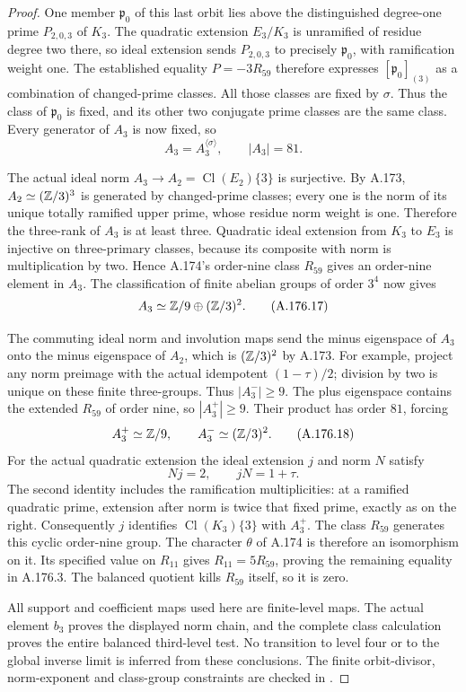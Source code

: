 \begin{proof}
One member \(\mathfrak p_0\) of this last orbit lies above the
distinguished degree-one prime \(P_{2,0,3}\) of \(K_3\).
The quadratic extension \(E_3/K_3\) is unramified of residue
degree two there, so ideal extension sends
\(P_{2,0,3}\) to precisely \(\mathfrak p_0\), with ramification
weight one.
The established equality \(P=-3R_{59}\) therefore expresses
\([\mathfrak p_0]_{(3)}\) as a combination of changed-prime
classes.  All those classes are fixed by \(\sigma\).
Thus the class of \(\mathfrak p_0\) is fixed, and its other
two conjugate prime classes are the same class.
Every generator of \(A_3\) is now fixed, so
\[
                              A_3=A_3^{\langle\sigma\rangle},
                              \qquad |A_3|=81 .
\tag{A.176.16}
\]

The actual ideal norm \(A_3\to A_2=\operatorname{Cl}(E_2)\{3\}\)
is surjective.  By A.173, \(A_2\simeq(\mathbb Z/3)^3\) is generated
by changed-prime classes; every one is the norm of its unique
totally ramified upper prime, whose residue norm weight is one.
Therefore the three-rank of \(A_3\) is at least three.
Quadratic ideal extension from \(K_3\) to \(E_3\) is injective
on three-primary classes, because its composite with norm is
multiplication by two.  Hence A.174's order-nine class \(R_{59}\)
gives an order-nine element in \(A_3\).
The classification of finite abelian groups of order \(3^4\)
now gives
\[
                             A_3\simeq\mathbb Z/9\oplus(\mathbb Z/3)^2.
\tag{A.176.17}
\]

The commuting ideal norm and involution maps send the minus
eigenspace of \(A_3\) onto the minus eigenspace of \(A_2\),
which is \((\mathbb Z/3)^2\) by A.173.
For example, project any norm preimage with the actual
idempotent \((1-\tau)/2\); division by two is unique on
these finite three-groups.
Thus \(|A_3^-|\ge9\).
The plus eigenspace contains the extended \(R_{59}\) of
order nine, so \(|A_3^+|\ge9\).
Their product has order \(81\), forcing
\[
                              A_3^+\simeq\mathbb Z/9,\qquad
                              A_3^-\simeq(\mathbb Z/3)^2.
\tag{A.176.18}
\]
For the actual quadratic extension the ideal extension \(j\)
and norm \(N\) satisfy
\[
                   Nj=2,\qquad jN=1+\tau.
\tag{A.176.19}
\]
The second identity includes the ramification multiplicities:
at a ramified quadratic prime, extension after norm is twice
that fixed prime, exactly as on the right.
Consequently \(j\) identifies
\(\operatorname{Cl}(K_3)\{3\}\) with \(A_3^+\).
The class \(R_{59}\) generates this cyclic order-nine group.
The character \(\theta\) of A.174 is therefore an isomorphism
on it.  Its specified value on \(R_{11}\) gives
\(R_{11}=5R_{59}\), proving the remaining equality in A.176.3.
The balanced quotient kills \(R_{59}\) itself, so it is zero.

All support and coefficient maps used here are finite-level maps.
The actual element \(b_3\) proves the displayed norm chain, and
the complete class calculation proves the entire balanced
third-level test.  No transition to level four or to the global
inverse limit is inferred from these conclusions.
The finite orbit-divisor, norm-exponent and class-group
constraints are checked in
.
\end{proof}
